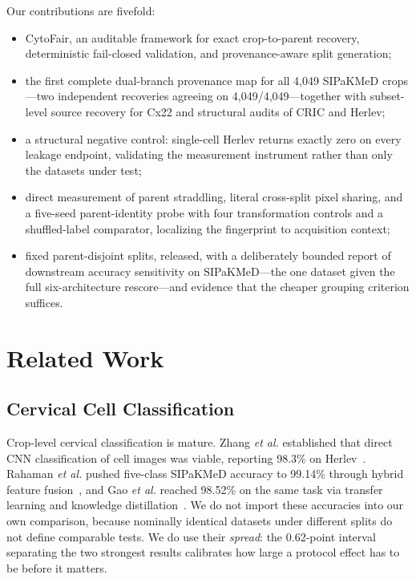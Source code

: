 \documentclass[conference]{IEEEtran}
\newcommand{\cytofair}{CytoFair}
\begin{document}
Our contributions are fivefold:
\begin{itemize}
    \item \cytofair, an auditable framework for exact crop-to-parent recovery, deterministic fail-closed validation, and provenance-aware split generation;
    \item the first complete dual-branch provenance map for all 4,049 SIPaKMeD crops---two independent recoveries agreeing on 4,049/4,049---together with subset-level source recovery for Cx22 and structural audits of CRIC and Herlev;
    \item a structural negative control: single-cell Herlev returns exactly zero on every leakage endpoint, validating the measurement instrument rather than only the datasets under test;
    \item direct measurement of parent straddling, literal cross-split pixel sharing, and a five-seed parent-identity probe with four transformation controls and a shuffled-label comparator, localizing the fingerprint to acquisition context;
    \item fixed parent-disjoint splits, released, with a deliberately bounded report of downstream accuracy sensitivity on SIPaKMeD---the one dataset given the full six-architecture rescore---and evidence that the cheaper grouping criterion suffices.
\end{itemize}

\section{Related Work}
\subsection{Cervical Cell Classification}
Crop-level cervical classification is mature.
Zhang \emph{et al.} established that direct CNN classification of cell images was viable, reporting 98.3\% on Herlev~\cite{zhang2017deeppap}.
Rahaman \emph{et al.} pushed five-class SIPaKMeD accuracy to 99.14\% through hybrid feature fusion~\cite{rahaman2021deepcervix}, and Gao \emph{et al.} reached 98.52\% on the same task via transfer learning and knowledge distillation~\cite{gao2022knowledge}.
We do not import these accuracies into our own comparison, because nominally identical datasets under different splits do not define comparable tests.
We do use their \emph{spread}: the 0.62-point interval separating the two strongest results calibrates how large a protocol effect has to be before it matters.
\end{document}
